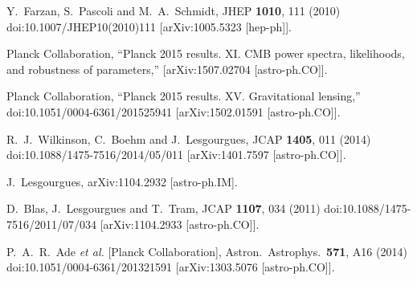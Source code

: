 \documentclass[aps,prd,a4paper,twocolumn,amsmath,showpacs,superscriptaddress,nofootinbib,preprintnumbers]{revtex4-1}
\begin{document}
\begin{thebibliography}{99}
  Y.~Farzan, S.~Pascoli and M.~A.~Schmidt,
  JHEP {\bf 1010}, 111 (2010)
  doi:10.1007/JHEP10(2010)111
  [arXiv:1005.5323 [hep-ph]].
  
  
  Planck Collaboration, ``Planck 2015 results. XI. CMB power spectra, likelihoods, and robustness of parameters,''
  [arXiv:1507.02704 [astro-ph.CO]].

  Planck Collaboration, ``Planck 2015 results. XV. Gravitational lensing,''
  doi:10.1051/0004-6361/201525941
  [arXiv:1502.01591 [astro-ph.CO]].
  
  R.~J.~Wilkinson, C.~Boehm and J.~Lesgourgues,
  JCAP {\bf 1405}, 011 (2014)
  doi:10.1088/1475-7516/2014/05/011
  [arXiv:1401.7597 [astro-ph.CO]].
  
  J.~Lesgourgues,
  arXiv:1104.2932 [astro-ph.IM].
  
  D.~Blas, J.~Lesgourgues and T.~Tram,
  JCAP {\bf 1107}, 034 (2011)
  doi:10.1088/1475-7516/2011/07/034
  [arXiv:1104.2933 [astro-ph.CO]].
  
  P.~A.~R.~Ade {\it et al.} [Planck Collaboration],
  Astron.\ Astrophys.\  {\bf 571}, A16 (2014)
  doi:10.1051/0004-6361/201321591
  [arXiv:1303.5076 [astro-ph.CO]].
  

\end{thebibliography}
\end{document}
